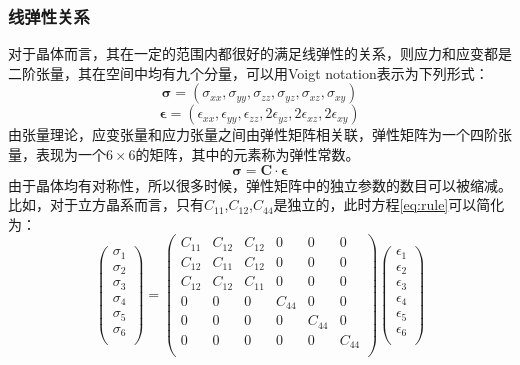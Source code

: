 \subsubsection{线弹性关系}
对于晶体而言，其在一定的范围内都很好的满足线弹性的关系，则应力和应变都是二阶张量，其在空间中均有九个分量，可以用Voigt notation表示为下列形式：
\begin{equation}
\label{eq:stress}
\mathbf{\sigma} =\left( \sigma_{xx}, \sigma_{yy}, \sigma_{zz}, \sigma_{yz}, \sigma_{xz}, \sigma_{xy} \right)
\end{equation}
\begin{equation}
\label{eq:strain}
\mathbf{\epsilon} =\left( \epsilon_{xx}, \epsilon_{yy}, \epsilon_{zz}, 2\epsilon_{yz}, 2\epsilon_{xz}, 2\epsilon_{xy} \right)
\end{equation}
由张量理论，应变张量和应力张量之间由弹性矩阵相关联，弹性矩阵为一个四阶张量，表现为一个$6 \times 6$的矩阵，其中的元素称为弹性常数。
\begin{equation}
\label{eq:rule}
\mathbf{\sigma} = \mathbf{C} \cdot \mathbf{\epsilon} 
\end{equation}
由于晶体均有对称性，所以很多时候，弹性矩阵中的独立参数的数目可以被缩减。比如，对于立方晶系而言，只有$C_{11}$,$C_{12}$,$C_{44}$是独立的，此时方程\ref{eq:rule}可以简化为：
\begin{equation}
\begin{pmatrix}
\sigma_1\\
\sigma_2\\
\sigma_3\\
\sigma_4\\
\sigma_5\\
\sigma_6\\
\end{pmatrix}
=
\begin{pmatrix}
C_{11} & C_{12} & C_{12} & 0 & 0 & 0\\
C_{12} & C_{11} & C_{12} & 0 & 0 & 0\\
C_{12} & C_{12} & C_{11} & 0 & 0 & 0\\
0&0&0& C_{44} & 0 & 0\\
0&0&0& 0 &C_{44} & 0 \\
0&0&0& 0 & 0& C_{44} \\
\end{pmatrix}
\begin{pmatrix}
\epsilon_1\\
\epsilon_2\\
\epsilon_3\\
\epsilon_4\\
\epsilon_5\\
\epsilon_6\\
\end{pmatrix}
\end{equation}
